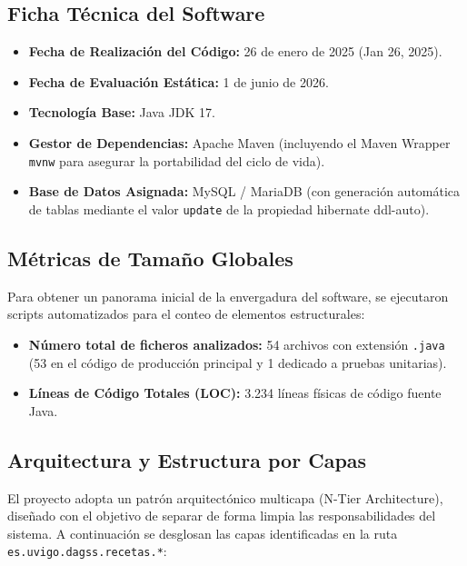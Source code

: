 \documentclass[12pt,a4paper]{article}
\begin{document}
\subsection{Ficha Técnica del Software}
\begin{itemize}
    \item \textbf{Fecha de Realización del Código:} 26 de enero de 2025 (Jan 26, 2025).
    \item \textbf{Fecha de Evaluación Estática:} 1 de junio de 2026.
    \item \textbf{Tecnología Base:} Java JDK 17.
    \item \textbf{Gestor de Dependencias:} Apache Maven (incluyendo el Maven Wrapper \texttt{mvnw} para asegurar la portabilidad del ciclo de vida).
    \item \textbf{Base de Datos Asignada:} MySQL / MariaDB (con generación automática de tablas mediante el valor \texttt{update} de la propiedad hibernate ddl-auto).
\end{itemize}

\subsection{Métricas de Tamaño Globales}
Para obtener un panorama inicial de la envergadura del software, se ejecutaron scripts automatizados para el conteo de elementos estructurales:
\begin{itemize}
    \item \textbf{Número total de ficheros analizados:} 54 archivos con extensión \texttt{.java} (53 en el código de producción principal y 1 dedicado a pruebas unitarias).
    \item \textbf{Líneas de Código Totales (LOC):} 3.234 líneas físicas de código fuente Java.
\end{itemize}

\subsection{Arquitectura y Estructura por Capas}
El proyecto adopta un patrón arquitectónico multicapa (N-Tier Architecture), diseñado con el objetivo de separar de forma limpia las responsabilidades del sistema. A continuación se desglosan las capas identificadas en la ruta \texttt{es.uvigo.dagss.recetas.*}:
\end{document}
